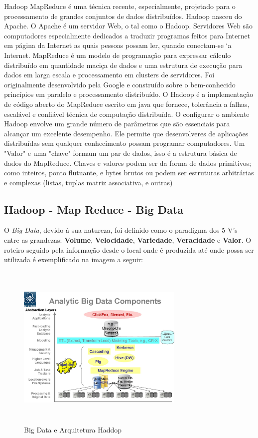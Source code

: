 \documentclass[conference,compsoc]{IEEEtran}
\begin{document}
Hadoop MapReduce é uma técnica recente, especialmente, projetado para o processamento de grandes conjuntos de dados distribuídos. Hadoop nasceu do Apache. O Apache é um servidor Web, o tal como o Hadoop. Servidores Web são computadores especialmente dedicados a traduzir programas feitos para Internet em página da Internet as quais pessoas possam ler, quando conectam-se `a Internet. MapReduce é um modelo de programação para expressar cálculo distribuído em quantidade maciça de
dados e uma estrutura de execução para dados em larga escala e processamento em clusters de servidores. Foi originalmente desenvolvido pela Google e construído sobre o bem-conhecido
princípios em paralelo e processamento distribuído.
O Hadoop é a implementação de código aberto do MapReduce escrito em java que fornece, tolerância a falhas, escalável e confiável técnica de computação distribuída.
O configurar o ambiente Hadoop envolve um grande número de parâmetros que são essenciais para alcançar um excelente desempenho. Ele permite que desenvolveres de aplicações distribuídas sem qualquer conhecimento possam programar computadores. 
Um "Valor" e uma "chave" formam um par de dados, isso é a estrutura básica de dados do MapReduce. 
Chaves e valores podem ser da forma de dados primitivos; como inteiros, ponto flutuante,  e bytes brutos ou podem ser estruturas arbitrárias e complexas (listas, tuplas matriz associativa, e outras)


\subsection{Hadoop - Map Reduce - Big Data}\label{arte:palavraChave:HadoopMapReduce}

O \textit{Big Data}, devido à sua natureza, foi definido como o paradigma dos 5 V's entre as grandezas: \textbf{Volume}, \textbf{Velocidade}, \textbf{Variedade}, \textbf{Veracidade} e \textbf{Valor}.
O roteiro seguido pela informação desde o local onde é produzida até onde 
possa ser utilizada é exemplificado na imagem a seguir:

\begin{figure}[ht]
\centering
\caption{Big Data e Arquitetura Haddop}
\includegraphics[width=80mm, height=80mm]{Figuras/BigDataComponents.jpg}
\end{figure}
\end{document}
